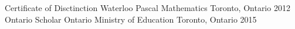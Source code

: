 \begin{cvhonors}
  \cvhonor
    {Certificate of Disctinction}
    {Waterloo Pascal Mathematics}
    {Toronto, Ontario}
    {2012}
  \cvhonor
    {Ontario Scholar}
    {Ontario Ministry of Education}
    {Toronto, Ontario}
    {2015}
\end{cvhonors}
